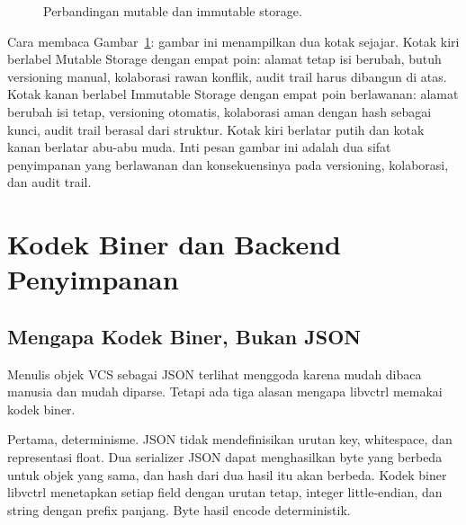 \documentclass[11pt,a4paper]{article}
\begin{document}
\begin{figure}[H]
	\centering
	\caption{Perbandingan mutable dan immutable storage.}
	\label{fig:immut}
\end{figure}

Cara membaca Gambar~\ref{fig:immut}: gambar ini menampilkan dua kotak sejajar. Kotak kiri berlabel Mutable Storage dengan empat poin: alamat tetap isi berubah, butuh versioning manual, kolaborasi rawan konflik, audit trail harus dibangun di atas. Kotak kanan berlabel Immutable Storage dengan empat poin berlawanan: alamat berubah isi tetap, versioning otomatis, kolaborasi aman dengan hash sebagai kunci, audit trail berasal dari struktur. Kotak kiri berlatar putih dan kotak kanan berlatar abu-abu muda. Inti pesan gambar ini adalah dua sifat penyimpanan yang berlawanan dan konsekuensinya pada versioning, kolaborasi, dan audit trail.

\section{Kodek Biner dan Backend Penyimpanan}

\subsection{Mengapa Kodek Biner, Bukan JSON}

Menulis objek VCS sebagai JSON terlihat menggoda karena mudah dibaca manusia dan mudah diparse. Tetapi ada tiga alasan mengapa libvctrl memakai kodek biner.

Pertama, determinisme. JSON tidak mendefinisikan urutan key, whitespace, dan representasi float. Dua serializer JSON dapat menghasilkan byte yang berbeda untuk objek yang sama, dan hash dari dua hasil itu akan berbeda. Kodek biner libvctrl menetapkan setiap field dengan urutan tetap, integer little-endian, dan string dengan prefix panjang. Byte hasil encode deterministik.
\end{document}
